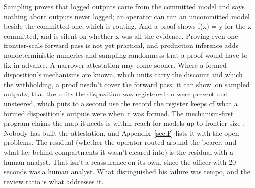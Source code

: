Sampling proves that logged outputs came from the committed model and says nothing about outputs never logged; an operator can run an uncommitted model beside the committed one, which is routing. And a proof shows f(x) = y for the x committed, and is silent on whether x was all the evidence. Proving even one frontier-scale forward pass is not yet practical, and production inference adds nondeterministic numerics and sampling randomness that a proof would have to fix in advance. A narrower attestation may come sooner. Where a formed disposition's mechanisms are known, which units carry the discount and which the withholding, a proof needn't cover the forward pass: it can show, on sampled outputs, that the units the disposition was registered on were present and unsteered, which puts to a second use the record the register keeps of what a formed disposition's outputs were when it was formed. The mechanism-first program claims the map it needs is within reach for models up to frontier size \autocite{cammarata2026clean}. Nobody has built the attestation, and Appendix~\ref{sec:F} lists it with the open problems. The residual (whether the operator routed around the bearer, and what lay behind compartments it wasn't cleared into) is the residual with a human analyst. That isn't a reassurance on its own, since the officer with 20 seconds was a human analyst. What distinguished his failure was tempo, and the review ratio is what addresses it.
